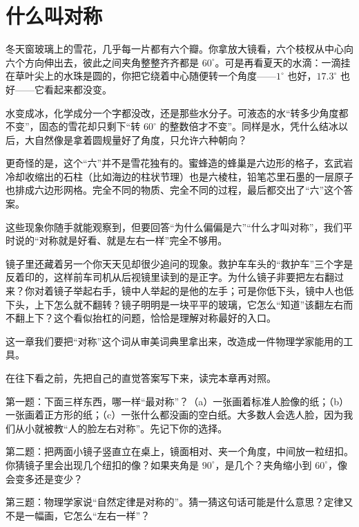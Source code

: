 \chapter{什么叫对称}


冬天窗玻璃上的雪花，几乎每一片都有六个瓣。你拿放大镜看，六个枝杈从中心向六个方向伸出去，彼此之间夹角整整齐齐都是 \(60^\circ\)。可是再看夏天的水滴：一滴挂在草叶尖上的水珠是圆的，你把它绕着中心随便转一个角度——\(1^\circ\) 也好，\(17.3^\circ\) 也好——它看起来都没变。

水变成冰，化学成分一个字都没改，还是那些水分子。可液态的水“转多少角度都不变”，固态的雪花却只剩下“转 \(60^\circ\) 的整数倍才不变”。同样是水，凭什么结冰以后，大自然像是拿着圆规量好了角度，只允许六种朝向？

更奇怪的是，这个“六”并不是雪花独有的。蜜蜂造的蜂巢是六边形的格子，玄武岩冷却收缩出的石柱（比如海边的柱状节理）也是六棱柱，铅笔芯里石墨的一层原子也排成六边形网格。完全不同的物质、完全不同的过程，最后都交出了“六”这个答案。

这些现象你随手就能观察到，但要回答“为什么偏偏是六”“什么才叫对称”，我们平时说的“对称就是好看、就是左右一样”完全不够用。

镜子里还藏着另一个你天天见却很少追问的现象。救护车车头的“救护车”三个字是反着印的，这样前车司机从后视镜里读到的是正字。为什么镜子非要把左右翻过来？你对着镜子举起右手，镜中人举起的是他的左手；可是你低下头，镜中人也低下头，上下怎么就不翻转？镜子明明是一块平平的玻璃，它怎么“知道”该翻左右而不翻上下？这个看似抬杠的问题，恰恰是理解对称最好的入口。

这一章我们要把“对称”这个词从审美词典里拿出来，改造成一件物理学家能用的工具。


在往下看之前，先把自己的直觉答案写下来，读完本章再对照。

第一题：下面三样东西，哪一样“最对称”？（a）一张画着标准人脸像的纸；（b）一张画着正方形的纸；（c）一张什么都没画的空白纸。大多数人会选人脸，因为我们从小就被教“人的脸左右对称”。先记下你的选择。

第二题：把两面小镜子竖直立在桌上，镜面相对、夹一个角度，中间放一粒纽扣。你猜镜子里会出现几个纽扣的像？如果夹角是 \(90^\circ\)，是几个？夹角缩小到 \(60^\circ\)，像会变多还是变少？

第三题：物理学家说“自然定律是对称的”。猜一猜这句话可能是什么意思？定律又不是一幅画，它怎么“左右一样”？


